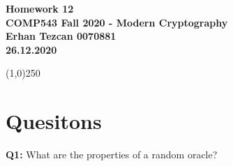 \documentclass[12pt,reqno]{amsart}
\newcommand{\code}[1]{\texttt{#1}}
\begin{document}
\begin{center}
\large\textbf{Homework 12 \\ COMP543 Fall 2020 - Modern Cryptography \\}
\normalsize\textbf{ Erhan Tezcan 0070881 \\ 26.12.2020} \\
\end{center}

\begin{center}
\line(1,0){250}
\end{center}

%
%

%
%

\section{Quesitons}
\textbf{Q1:} What are the properties of a random oracle?
\end{document}
